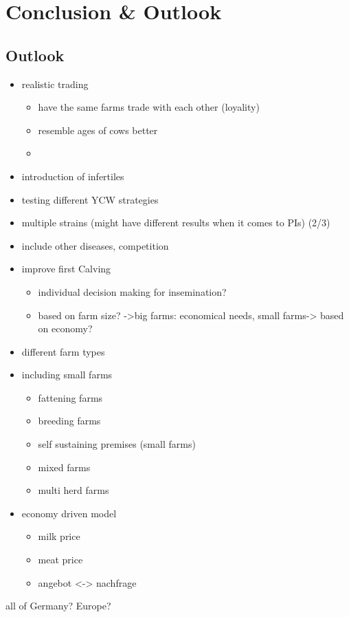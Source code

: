 \chapter{Conclusion \& Outlook}
\section{Outlook}
\begin{itemize}
\item realistic trading
\begin{itemize}
\item have the same farms trade with each other (loyality)
\item resemble ages of cows better
\item 
\end{itemize}
\item introduction of infertiles
\item testing different YCW strategies
\item multiple strains (might have different results when it comes to PIs) (2/3)
\item include other diseases, competition
\item improve first Calving 
\begin{itemize}
\item individual decision making for insemination? 
\item based on farm size? ->big farms: economical needs, small farms-> based on economy?
\end{itemize}
\item different farm types
\item including small farms
\begin{itemize}
\item fattening farms
\item breeding farms
\item self sustaining premises (small farms)
\item mixed farms
\item multi herd farms
\end{itemize}

\item economy driven model
\begin{itemize}
\item milk price
\item meat price
\item angebot <-> nachfrage
\end{itemize}
\end{itemize}
\item all of Germany? Europe?

